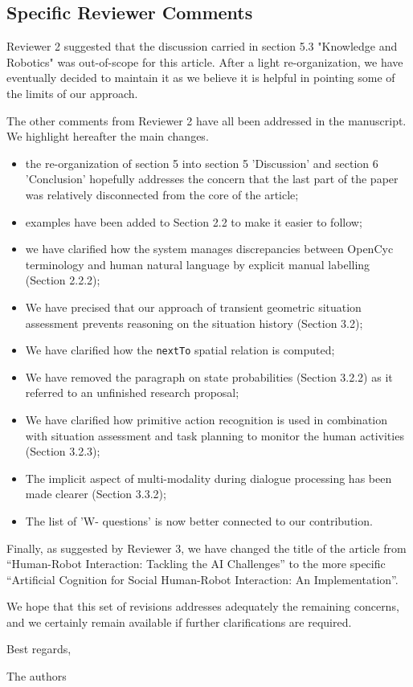 \documentclass{article}
\begin{document}
\subsection*{Specific Reviewer Comments}

Reviewer 2 suggested that the discussion carried in section 5.3 "Knowledge and
Robotics" was out-of-scope for this article. After a light re-organization,
we have eventually decided to maintain it as we believe it is helpful in
pointing some of the limits of our approach.

The other comments from Reviewer 2 have all been addressed in the manuscript.
We highlight hereafter the main changes.

\begin{itemize}
    \item the re-organization of section 5 into section 5 'Discussion' and
        section 6 'Conclusion' hopefully addresses the concern that the last part of the
        paper was relatively disconnected from the core of the article;
    \item examples have been added to Section 2.2 to make it easier to follow;
    \item we have clarified how the system manages discrepancies between OpenCyc
        terminology and human natural language by explicit manual labelling
        (Section 2.2.2);
    \item We have precised that our approach of transient geometric situation assessment
        prevents reasoning on the situation history (Section 3.2);
    \item We have clarified how the {\tt nextTo} spatial relation is computed;
    \item We have removed the paragraph on state probabilities (Section 3.2.2)
        as it referred to an unfinished research proposal;
    \item We have clarified how primitive action recognition is used in
        combination with situation assessment and task planning to monitor the
        human activities (Section 3.2.3);
    \item The implicit aspect of multi-modality during dialogue processing has
        been made clearer (Section 3.3.2);
    \item The list of 'W- questions' is now better connected to our
        contribution.
\end{itemize}


Finally, as suggested by Reviewer 3, we have changed the title of the article
from ``Human-Robot Interaction: Tackling the AI Challenges'' to the more
specific ``Artificial Cognition for Social Human-Robot Interaction: An
Implementation''.

\vspace{1em}
We hope that this set of revisions addresses adequately the remaining concerns,
and we certainly remain available if further clarifications are required.

\vspace{1em}
Best regards,

The authors




\end{document}
